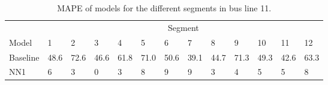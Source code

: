 \begin{table}[H]
	\centering
	\caption{MAPE of models for the different segments in bus line 11.}
	\label{fig:model-mape-of-segs-211}
	\begin{tabular}{ l | l | l | l | l | l | l | l | l | l | l | l | l}
		& \multicolumn{12}{c}{Segment} \\
		Model       & 1 & 2 & 3 & 4 & 5 & 6 & 7 & 8 & 9 & 10 & 11 & 12 \\
		\hline
		Baseline  & 48.6 & 72.6 & 46.6 & 61.8 & 71.0 & 50.6 & 39.1 & 44.7 & 71.3 & 49.3  & 42.6 & 63.3 \\
		NN1         & 6 & 3 & 0 & 3 &  8 & 9 &  9 & 3 & 4 & 5  & 5 & 8\\
	\end{tabular}
\end{table}





